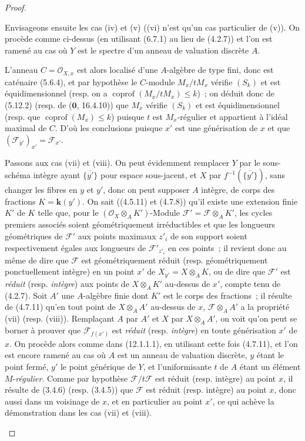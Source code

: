 \begin{proof}
\begin{env}[12.1.1.2]
\label{IV.12.1.1.2-fr}
Envisageons ensuite les cas (iv) et (v) ((vi) n'est qu'un cas particulier de
(v)). On procède comme ci-dessus (en utilisant (6.7.1) au lieu de (4.2.7)) et
l'on est ramené au cas où $Y$ est le spectre d'un anneau de valuation discrète
$A$.

L'anneau $C=\mathcal O_{X,x}$ est alors localisé d'une $A$-algèbre de type
fini, donc est caténaire (5.6.4), et par hypothèse le $C$-module
$M_x/tM_x$ vérifie $(S_k)$ et est équidimensionnel (resp. on a
$\operatorname{coprof}(M_x/tM_x)\leq k$)~; on déduit donc de (5.12.2) (resp.
de ($\mathbf 0$, 16.4.10)) que $M_x$ vérifie $(S_k)$ et est équidimensionnel
(resp. que $\operatorname{coprof}(M_x)\leq k$) puisque $t$ est $M_x$-régulier
et appartient à l'idéal maximal de $C$. D'où les conclusions puisque $x'$ est
une générisation de $x$ et que $(\mathcal F_{y'})_{x'}=\mathcal F_{x'}$.
\end{env}

\begin{env}[12.1.1.3]
\label{IV.12.1.1.3-fr}
Passons aux cas (vii) et (viii). On peut évidemment remplacer $Y$ par le
sous-schéma intègre ayant $\overline{\{y'\}}$ pour espace sous-jacent, et $X$
par $f^{-1}(\overline{\{y'\}})$, sans changer les fibres en $y$ et $y'$, donc
on peut supposer $A$ intègre, de corps des fractions $K=\boldsymbol{k}(y')$. On sait
((4.5.11) et (4.7.8)) qu'il existe une extension finie $K'$ de $K$ telle que,
pour le $(\mathcal O_X\otimes_AK')$-Module
$\mathcal F'=\mathcal F\otimes_AK'$, les cycles premiers associés soient
géométriquement irréductibles et que les longueurs géométriques de
$\mathcal F'$ aux points maximaux $z'_i$ de son support soient respectivement
égales aux longueurs de $\mathcal F'_{z'_i}$ en ces points~; il revient donc
au même de dire que $\mathcal F$ est géométriquement réduit (resp.
géométriquement ponctuellement intègre) en un point $x'$ de
$X_{y'}=X\otimes_AK$, ou de dire que $\mathcal F'$ est \emph{réduit} (resp. \emph{intègre})
aux points de $X\otimes_AK'$ au-dessus de $x'$, compte tenu de (4.2.7). Soit
$A'$ une $A$-algèbre finie dont $K'$ est le corps des fractions~; il résulte
de (4.7.11) qu'en tout point de $X\otimes_AA'$ au-dessus de $x$,
$\mathcal F\otimes_AA'$ a la propriété (vii) (resp. (viii)). Remplaçant $A$
par $A'$ et $X$ par $X\otimes_AA'$, on voit qu'on peut se borner à prouver que
$\mathcal F_{f(x')}$ est \emph{réduit} (resp. \emph{intègre}) en toute générisation $x'$ de $x$. On
procède alors comme dans (12.1.1.1), en utilisant cette fois (4.7.11), et l'on
est encore ramené au cas où $A$ est un anneau de valuation discrète, $y$ étant
le point fermé, $y'$ le point générique de $Y$, et l'uniformisante $t$ de $A$
étant un élément $M$-\emph{régulier}. Comme par hypothèse
$\mathcal F/t\mathcal F$ est réduit (resp. intègre) au point $x$, il résulte de
(3.4.6) (resp. (3.4.5)) que $\mathcal F$ est réduit (resp. intègre) au point
$x$, donc aussi dans un voisinage de $x$, et en particulier au point $x'$, ce
qui achève la démonstration dans les cas (vii) et (viii).
\end{env}


\end{proof}
